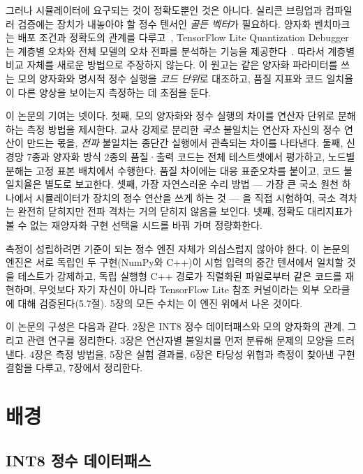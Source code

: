 \documentclass[11pt,a4paper,oneside]{report}
\begin{document}
그러나 시뮬레이터에 요구되는 것이 정확도뿐인 것은 아니다. 실리콘 브링업과 컴파일러 검증에는
장치가 내놓아야 할 정수 텐서인 \emph{골든 벡터}가 필요하다. 양자화 벤치마크는 배포 조건과 정확도의
관계를 다루고~\cite{mqbench}, TensorFlow Lite Quantization Debugger는 계층별 오차와 전체 모델의
오차 전파를 분석하는 기능을 제공한다~\cite{quantdebug}. 따라서 계층별 비교 자체를 새로운 방법으로
주장하지 않는다. 이 원고는 같은 양자화 파라미터를 쓰는 모의 양자화와 명시적 정수 실행을
\emph{코드 단위}로 대조하고, 품질 지표와 코드 일치율이 다른 양상을 보이는지 측정하는 데 초점을 둔다.

이 논문의 기여는 넷이다. 첫째, 모의 양자화와 정수 실행의 차이를 연산자 단위로 분해하는 측정 방법을
제시한다. 교사 강제로 분리한 \emph{국소} 불일치는 연산자 자신의 정수 연산이 만드는 몫을, \emph{전파}
불일치는 종단간 실행에서 관측되는 차이를 나타낸다. 둘째, 신경망 7종과 양자화 방식 2종의
품질·출력 코드는 전체 테스트셋에서 평가하고, 노드별 분해는 고정 표본 배치에서 수행한다.
품질 차이에는 대응 표준오차를 붙이고, 코드 불일치율은 별도로 보고한다. 셋째, 가장 자연스러운 수리 방법 --- 가장 큰 국소 원천 하나에서 시뮬레이터가 장치의 정수 연산을
쓰게 하는 것 --- 을 직접 시험하여, 국소 격차는 완전히 닫히지만 전파 격차는 거의 닫히지 않음을 보인다.
넷째, 정확도 대리지표가 볼 수 없는 재양자화 구현 선택을 시드를 바꿔 가며 정량화한다.

측정이 성립하려면 기준이 되는 정수 엔진 자체가 의심스럽지 않아야 한다. 이 논문의 엔진은 서로 독립인 두
구현(NumPy와 C++)이 시험 입력의 중간 텐서에서 일치할 것을 테스트가 강제하고, 독립 실행형 C++ 경로가
직렬화된 파일로부터 같은 코드를 재현하며, 무엇보다 자기 자신이 아니라 TensorFlow Lite 참조 커널이라는 외부
오라클에 대해 검증된다(5.7절). 5장의 모든 수치는 이 엔진 위에서 나온 것이다.

\medskip
이 논문의 구성은 다음과 같다. 2장은 INT8 정수 데이터패스와 모의 양자화의 관계, 그리고 관련 연구를
정리한다. 3장은 연산자별 불일치를 먼저 분류해 문제의 모양을 드러낸다. 4장은 측정 방법을, 5장은 실험
결과를, 6장은 타당성 위협과 측정이 찾아낸 구현 결함을 다루고, 7장에서 정리한다.

\chapter{배경}

\section{INT8 정수 데이터패스}
\end{document}
